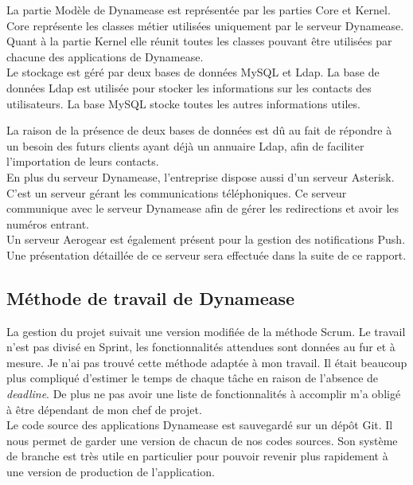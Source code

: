 La partie Modèle de Dynamease est représentée par les parties Core et Kernel. Core représente les classes métier utilisées uniquement par le serveur Dynamease. Quant à la partie Kernel elle réunit toutes les classes pouvant être utilisées par chacune des applications de Dynamease.\\

Le stockage est géré par deux bases de données MySQL et Ldap. La base de données Ldap est utilisée pour stocker les informations sur les contacts des utilisateurs. La base MySQL stocke toutes les autres informations utiles.

La raison de la présence de deux bases de données est dû au fait de répondre à un besoin des futurs clients ayant déjà un annuaire Ldap, afin de faciliter l'importation de leurs contacts.\\

En plus du serveur Dynamease, l'entreprise dispose aussi d'un serveur Asterisk. C'est un serveur gérant les communications téléphoniques. Ce serveur communique avec le serveur Dynamease afin de gérer les redirections et avoir les numéros entrant.\\

Un serveur Aerogear est également présent pour la gestion des notifications Push. Une présentation détaillée de ce serveur sera effectuée dans la suite de ce rapport.

\subsection{Méthode de travail de Dynamease}

La gestion du projet suivait une version modifiée de la méthode Scrum. Le travail n'est pas divisé en Sprint, les fonctionnalités attendues sont données au fur et à mesure. Je n'ai pas trouvé cette méthode adaptée à mon travail. Il était beaucoup plus compliqué d'estimer le temps de chaque tâche en raison de l'absence de \textit{deadline}. De plus ne pas avoir une liste de fonctionnalités à accomplir m'a obligé à être dépendant de mon chef de projet.\\

Le code source des applications Dynamease est sauvegardé sur un dépôt Git. Il nous permet de garder une version de chacun de nos codes sources. Son système de branche est très utile en particulier pour pouvoir revenir plus rapidement à une version de production de l'application.